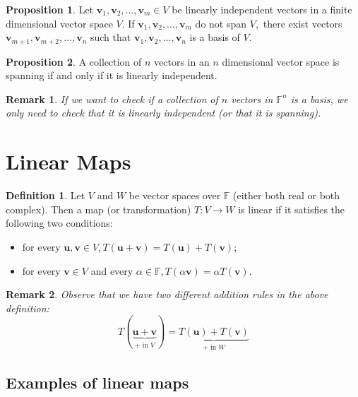 \documentclass[12pt, a4paper]{article}
\newtheorem*{remark}{Remark}
\theoremstyle{definition}
\newtheorem{definition}{Definition}[section]
\newtheorem{proposition}{Proposition}
\theoremstyle{plain}
\newcommand{\bb}[1]{\mathbb{#1}}
\newcommand{\vect}[1]{\mathbf{#1}}
\begin{document}
\begin{proposition} Let $\vect{v}_1,\vect{v}_2,\ldots,\vect{v}_m \in V$ be linearly independent vectors in a finite dimensional vector space $V.$ If $\vect{v}_1,\vect{v}_2,\ldots,\vect{v}_m$ do not span $V,$ there exist vectors $\vect{v}_{m+1},\vect{v}_{m+2},\ldots,\vect{v}_n$ such that $\vect{v}_1,\vect{v}_2,\ldots,\vect{v}_n$ is a basis of $V.$ \end{proposition}

\begin{proposition} A collection of $n$ vectors in an $n$ dimensional vector space is spanning if and only if it is linearly independent.\end{proposition}

\begin{remark}
If we want to check if a collection of $n$ vectors in $\bb{F}^n$ is a basis, we only need to check that it is linearly independent (or that it is spanning).
\end{remark}

\section{Linear Maps}

\begin{definition} Let $V$ and $W$ be vector spaces over $\bb{F}$ (either both real or both complex). Then a map (or transformation) $T : V \rightarrow W$ is linear if it satisfies the following two conditions:
\begin{itemize}
	
	\item for every $\vect{u},\vect{v} \in V, T(\vect{u+v})=T(\vect{u})+T(\vect{v})$;

	\item for every $\vect{v} \in V$ and every $\alpha \in \bb{F},T(\alpha\vect{v})=\alpha T(\vect{v}).$

\end{itemize}
\end{definition}

\begin{remark}
Observe that we have two different addition rules in the above definition: $$T(\underbrace{\vect{u+v}}_\text{$+$ in $V$})=\underbrace{T(\vect{u})+T(\vect{v})}_\text{$+$ in $W$}$$
\end{remark}

\subsection*{Examples of linear maps}
\end{document}
